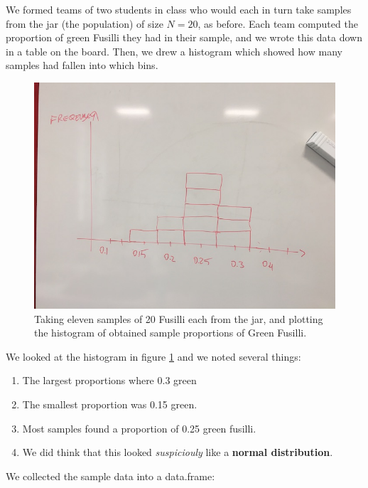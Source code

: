 \documentclass[]{book}
\providecommand{\tightlist}{%
  \setlength{\itemsep}{0pt}\setlength{\parskip}{0pt}}
\begin{document}
We formed teams of two students in class who would each in turn take samples from the jar (the population) of size \(N=20\), as before. Each team computed the proportion of green Fusilli they had in their sample, and we wrote this data down in a table on the board. Then, we drew a histogram which showed how many samples had fallen into which bins.

\begin{figure}

{\centering \includegraphics[width=0.9\linewidth]{images/pasta6} 

}

\caption{Taking eleven samples of 20 Fusilli each from the jar, and plotting the histogram of obtained sample proportions of Green Fusilli.}\label{fig:pasta6}
\end{figure}

We looked at the histogram in figure \ref{fig:pasta6} and we noted several things:

\begin{enumerate}
\def\labelenumi{\arabic{enumi}.}
\tightlist
\item
  The largest proportions where 0.3 green
\item
  The smallest proportion was 0.15 green.
\item
  Most samples found a proportion of 0.25 green fusilli.
\item
  We did think that this looked \emph{suspiciouly} like a \textbf{normal distribution}.
\end{enumerate}

We collected the sample data into a data.frame:
\end{document}
